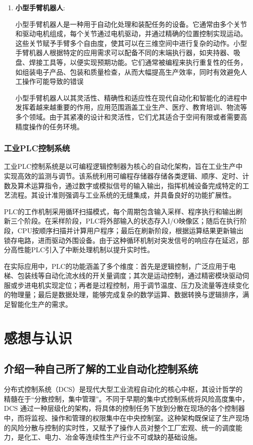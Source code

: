 \documentclass{article}
\begin{document}
\begin{enumerate}
\qquad 由于其高精度、灵活性和可重复性，三轴写字机被广泛应用于教育科研、艺术创作和工业设计。由于技术的进步和普及，三轴写字机也越来越受到手工艺者和设计师的青睐。
\item \textbf{小型手臂机器人}:\par
\qquad 小型手臂机器人是一种用于自动化处理和装配任务的设备。它通常由多个关节和驱动电机组成，每个关节通过电机驱动，并通过精确的位置控制实现运动。这些关节赋予手臂多个自由度，使其可以在三维空间中进行复杂的动作。小型手臂机器人根据特定的应用需求可以配备不同的末端执行器，如夹持器、吸盘、焊接工具等，以便实现预期功能。它们通常被编程来执行重复性的任务，如组装电子产品、包装和质量检查，从而大幅提高生产效率，同时有效避免人工操作可能导致的错误\par
\qquad 小型手臂机器人以其灵活性、精确性和适应性在现代自动化和智能化的进程中发挥着越来越重要的作用，应用范围涵盖工业生产、医疗、教育培训、物流等多个领域。由于其紧凑的设计和灵活性，它们尤其适合于空间有限或者需要高精度操作的任务环境。

\end{enumerate}
\subsubsection{工业PLC控制系统}
工业PLC控制系统是以可编程逻辑控制器为核心的自动化架构，旨在工业生产中实现高效的监测与调节。该系统利用可编程存储器存储各类逻辑、顺序、定时、计数及算术运算指令，通过数字或模拟信号的输入输出，指挥机械设备完成特定的工艺流程。其设计准则强调与工业系统的无缝集成，并具备良好的功能扩展性。\par
PLC的工作机制采用循环扫描模式，每个周期包含输入采样、程序执行和输出刷新三个阶段。在采样阶段，PLC将外部输入的状态存入I/O映像区；随后在执行阶段，CPU按顺序扫描并计算用户程序；最后在刷新阶段，根据运算结果更新输出锁存电路，进而驱动外围设备。由于这种循环机制对突发信号的响应存在延迟，部分高性能PLC引入了中断处理机制以提升实时性。\par
在实际应用中，PLC的功能涵盖了多个维度：首先是逻辑控制，广泛应用于电梯、包装线等自动化流水线的开关量调度；其次是运动控制，通过精密模块驱动伺服或步进电机实现定位；再者是过程控制，用于调节温度、压力及流量等连续变化的物理量；最后是数据处理，能够完成复杂的数学运算、数据转换与逻辑排序，满足智能化生产的需求。

\section{感想与认识}

\subsection{介绍一种自己所了解的工业自动化控制系统}
分布式控制系统（DCS）是现代大型工业流程自动化的核心中枢，其设计哲学的精髓在于“分散控制，集中管理”。不同于早期的集中式控制系统将风险高度集中，DCS 通过一种层级化的架构，将具体的控制任务下放到分散在现场的各个控制器中，而将监视、操作和管理的权限集中在中央控制室。这种架构既保证了生产现场的风险分散与控制的实时性，又赋予了操作人员对整个工厂宏观、统一的调度能力，是化工、电力、冶金等连续性生产行业不可或缺的基础设施。\par
\end{document}
